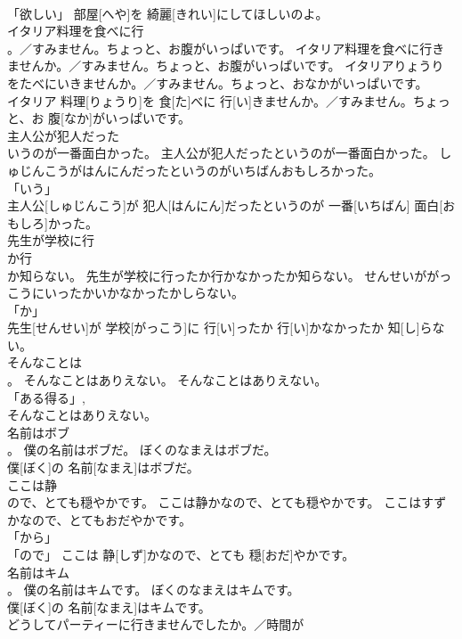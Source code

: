 \documentclass[8pt]{extreport}
\begin{document}
\begin{CJK}{UTF8}{min}
\\	「欲しい」	部屋[へや]を 綺麗[きれい]にしてほしいのよ。		
\\	イタリア料理を食べに行
\\	。／すみません。ちょっと、お腹がいっぱいです。	イタリア料理を食べに行きませんか。／すみません。ちょっと、お腹がいっぱいです。	イタリアりょうりをたべにいきませんか。／すみません。ちょっと、おなかがいっぱいです。	
\\	イタリア 料理[りょうり]を 食[た]べに 行[い]きませんか。／すみません。ちょっと、お 腹[なか]がいっぱいです。		
\\	主人公が犯人だった
\\	いうのが一番面白かった。	主人公が犯人だったというのが一番面白かった。	しゅじんこうがはんにんだったというのがいちばんおもしろかった。	
\\	「いう」 
\\	主人公[しゅじんこう]が 犯人[はんにん]だったというのが 一番[いちばん] 面白[おもしろ]かった。		
\\	先生が学校に行
\\	か行
\\	か知らない。	先生が学校に行ったか行かなかったか知らない。	せんせいががっこうにいったかいかなかったかしらない。	
\\	「か」 
\\	先生[せんせい]が 学校[がっこう]に 行[い]ったか 行[い]かなかったか 知[し]らない。		
\\	そんなことは
\\	。	そんなことはありえない。	そんなことはありえない。	
\\	「ある得る」, 
\\	そんなことはありえない。		
\\	名前はボブ
\\	。	僕の名前はボブだ。	ぼくのなまえはボブだ。	
\\	僕[ぼく]の 名前[なまえ]はボブだ。		
\\	ここは静
\\	ので、とても穏やかです。	ここは静かなので、とても穏やかです。	ここはすずかなので、とてもおだやかです。	
\\	「から」 
\\	「ので」	ここは 静[しず]かなので、とても 穏[おだ]やかです。		
\\	名前はキム
\\	。	僕の名前はキムです。	ぼくのなまえはキムです。	
\\	僕[ぼく]の 名前[なまえ]はキムです。		
\\	どうしてパーティーに行きませんでしたか。／時間が

\end{CJK}
\end{document}

